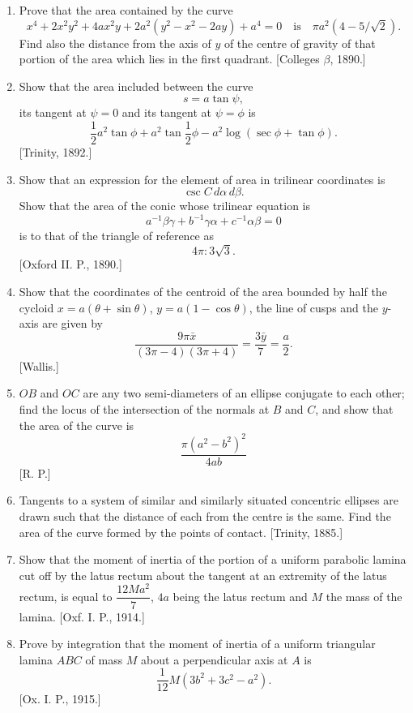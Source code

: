 \documentclass[11pt, a4paper]{article}
\newcommand{\source}[1]{\hfill\textnormal{[#1]}}
\begin{document}
\begin{enumerate}[leftmargin=2em]
(ii) In the Conchoid of Nicomedes $r=a\sec\theta-b$ in the case when $a<b$, show that the area of the loop is
\[
a^2(a\sec^2\alpha-2\sec\alpha\cosh^{-1}\sec\alpha+\tan\alpha),
\]
and that the distance of the centroid of the loop from the node is
\[
\frac23a\,\frac{3a\sec\alpha-3\cosh^{-1}\sec\alpha-\sin\alpha\tan^2\alpha}{a\sec\alpha-2\cosh^{-1}\sec\alpha+\sin\alpha},
\]
where $\alpha=\cos^{-1}a/b$.

\item Prove that the area contained by the curve
\[
x^4+2x^2y^2+4ax^2y+2a^2(y^2-x^2-2ay)+a^4=0\quad\text{is}\quad\pi a^2(4-5/\sqrt2).
\]
Find also the distance from the axis of $y$ of the centre of gravity of that portion of the area which lies in the first quadrant. \source{Colleges $\beta$, 1890.}

\item Show that the area included between the curve
\[
s=a\tan\psi,
\]
its tangent at $\psi=0$ and its tangent at $\psi=\phi$
is
\[
\frac12a^2\tan\phi+a^2\tan\frac12\phi-a^2\log(\sec\phi+\tan\phi).
\]
\source{Trinity, 1892.}

\item Show that an expression for the element of area in trilinear coordinates is
\[
\csc C\,d\alpha\,d\beta.
\]
Show that the area of the conic whose trilinear equation is
\[
a^{-1}\beta\gamma+b^{-1}\gamma\alpha+c^{-1}\alpha\beta=0
\]
is to that of the triangle of reference as
\[
4\pi:3\sqrt3.
\]
\source{Oxford II. P., 1890.}

\item Show that the coordinates of the centroid of the area bounded by half the cycloid $x=a(\theta+\sin\theta)$, $y=a(1-\cos\theta)$, the line of cusps and the $y$-axis are given by
\[
\frac{9\pi\bar x}{(3\pi-4)(3\pi+4)}=\frac{3\bar y}{7}=\frac{a}{2}.
\]
\source{Wallis.}

\item $OB$ and $OC$ are any two semi-diameters of an ellipse conjugate to each other; find the locus of the intersection of the normals at $B$ and $C$, and show that the area of the curve is
\[
\frac{\pi(a^2-b^2)^2}{4ab}
\]
\source{R. P.}

\item Tangents to a system of similar and similarly situated concentric ellipses are drawn such that the distance of each from the centre is the same. Find the area of the curve formed by the points of contact. \source{Trinity, 1885.}

\item Show that the moment of inertia of the portion of a uniform parabolic lamina cut off by the latus rectum about the tangent at an extremity of the latus rectum, is equal to $\dfrac{12Ma^2}{7}$, $4a$ being the latus rectum and $M$ the mass of the lamina. \source{Oxf. I. P., 1914.}

\item Prove by integration that the moment of inertia of a uniform triangular lamina $ABC$ of mass $M$ about a perpendicular axis at $A$ is
\[
\frac{1}{12}M(3b^2+3c^2-a^2).
\]
\source{Ox. I. P., 1915.}

\end{enumerate}
\end{document}
